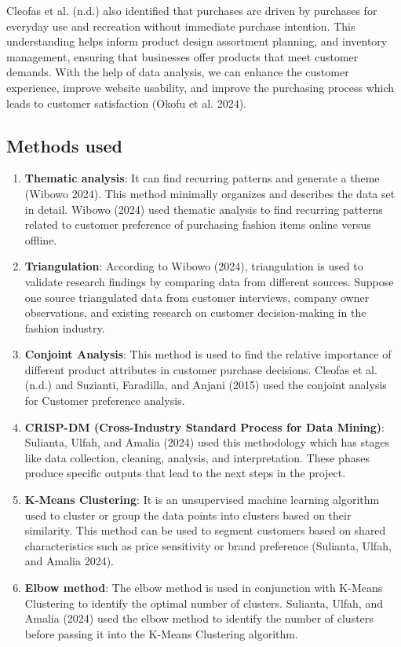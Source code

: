 \documentclass[
  letterpaper,
  DIV=11,
  numbers=noendperiod]{scrartcl}
\begin{document}
Cleofas et al. (n.d.) also identified that purchases are driven by
purchases for everyday use and recreation without immediate purchase
intention. This understanding helps inform product design assortment
planning, and inventory management, ensuring that businesses offer
products that meet customer demands. With the help of data analysis, we
can enhance the customer experience, improve website usability, and
improve the purchasing process which leads to customer satisfaction
(Okofu et al. 2024).

\subsection{Methods used}\label{methods-used}

\begin{enumerate}
\def\labelenumi{\arabic{enumi}.}
\item
  \textbf{Thematic analysis}: It can find recurring patterns and
  generate a theme (Wibowo 2024). This method minimally organizes and
  describes the data set in detail. Wibowo (2024) used thematic analysis
  to find recurring patterns related to customer preference of
  purchasing fashion items online versus offline.
\item
  \textbf{Triangulation}: According to Wibowo (2024), triangulation is
  used to validate research findings by comparing data from different
  sources. Suppose one source triangulated data from customer
  interviews, company owner observations, and existing research on
  customer decision-making in the fashion industry.
\item
  \textbf{Conjoint Analysis}: This method is used to find the relative
  importance of different product attributes in customer purchase
  decisions. Cleofas et al. (n.d.) and Suzianti, Faradilla, and Anjani
  (2015) used the conjoint analysis for Customer preference analysis.
\item
  \textbf{CRISP-DM (Cross-Industry Standard Process for Data Mining)}:
  Sulianta, Ulfah, and Amalia (2024) used this methodology which has
  stages like data collection, cleaning, analysis, and interpretation.
  These phases produce specific outputs that lead to the next steps in
  the project.
\item
  \textbf{K-Means Clustering}: It is an unsupervised machine learning
  algorithm used to cluster or group the data points into clusters based
  on their similarity. This method can be used to segment customers
  based on shared characteristics such as price sensitivity or brand
  preference (Sulianta, Ulfah, and Amalia 2024).
\item
  \textbf{Elbow method}: The elbow method is used in conjunction with
  K-Means Clustering to identify the optimal number of clusters.
  Sulianta, Ulfah, and Amalia (2024) used the elbow method to identify
  the number of clusters before passing it into the K-Means Clustering
  algorithm.
\end{enumerate}
\end{document}
